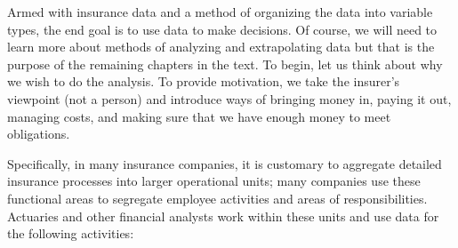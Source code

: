 \documentclass[]{book}
\theoremstyle{definition}
\theoremstyle{definition}
\theoremstyle{definition}
\theoremstyle{remark}
\begin{document}
Armed with insurance data and a method of organizing the data into
variable types, the end goal is to use data to make decisions. Of
course, we will need to learn more about methods of analyzing and
extrapolating data but that is the purpose of the remaining chapters in
the text. To begin, let us think about why we wish to do the analysis.
To provide motivation, we take the insurer's viewpoint (not a person)
and introduce ways of bringing money in, paying it out, managing costs,
and making sure that we have enough money to meet obligations.

Specifically, in many insurance companies, it is customary to aggregate
detailed insurance processes into larger operational units; many
companies use these functional areas to segregate employee activities
and areas of responsibilities. Actuaries and other financial analysts
work within these units and use data for the following activities:
\end{document}

